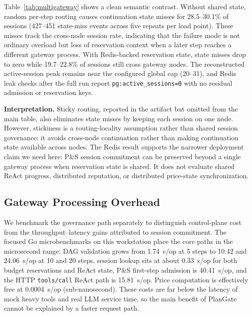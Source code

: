 \documentclass[sigconf,review,anonymous]{acmart}
\begin{document}
Table~\ref{tab:multigateway} shows a clean semantic contrast.
Without shared state, random per-step routing causes continuation state misses for 28.5--30.1\% of sessions (427--451 state-miss events across five repeats per load point).
These misses track the cross-node session rate, indicating that the failure mode is not ordinary overload but loss of reservation context when a later step reaches a different gateway process.
With Redis-backed reservation state, state misses drop to zero while 19.7--22.8\% of sessions still cross gateway nodes.
The reconstructed active-session peak remains near the configured global cap (20--31), and Redis leak checks after the full run report \texttt{pg:active\_sessions=0} with no residual admission or reservation keys.

\textbf{Interpretation.}
Sticky routing, reported in the artifact but omitted from the main table, also eliminates state misses by keeping each session on one node.
However, stickiness is a routing-locality assumption rather than shared session governance: it avoids cross-node continuation rather than making continuation state available across nodes.
The Redis result supports the narrower deployment claim we need here: P\&S session commitment can be preserved beyond a single gateway process when reservation state is shared.
It does not evaluate shared ReAct progress, distributed reputation, or distributed price-state synchronization.

\subsection{Gateway Processing Overhead}
\label{sec:gateway_overhead}

We benchmark the governance path separately to distinguish control-plane cost from the throughput--latency gains attributed to session commitment. The focused Go microbenchmarks on this workstation place the core paths in the microsecond range: DAG validation grows from 1.74~\mu s/op at 5 steps to 10.42 and 24.06~\mu s/op at 10 and 20 steps, session lookup sits at about 0.33~\mu s/op for both budget reservations and ReAct state, P\&S first-step admission is 40.41~\mu s/op, and the HTTP \texttt{tools/call} ReAct path is 15.81~\mu s/op. Price computation is effectively free at 0.0004~\mu s/op (sub-nanosecond). These costs are far below the latency of mock heavy tools and real LLM service time, so the main benefit of PlanGate cannot be explained by a faster request path.
\end{document}
